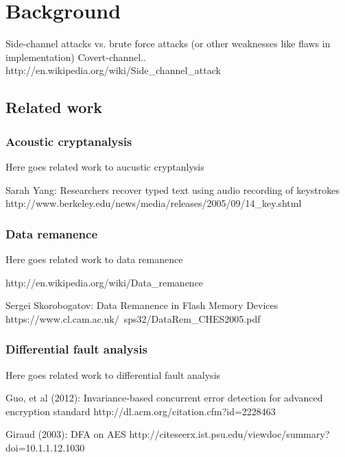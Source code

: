 \chapter{Background}
\label{chp:background} 

Side-channel attacks vs. brute force attacks (or other weaknesses like flaws in implementation)
Covert-channel.. 
http://en.wikipedia.org/wiki/Side\_channel\_attack


\section{Related work}\label{sec:related_work}

\subsection{Acoustic cryptanalysis}\label{sec:acoustic_cryptanalysis}

Here goes related work to aucustic cryptanlysis

Sarah Yang: Researchers recover typed text using audio recording of keystrokes 
http://www.berkeley.edu/news/media/releases/2005/09/14\_key.shtml


\subsection{Data remanence}\label{sec:data_remanence}

Here goes related work to data remanence

http://en.wikipedia.org/wiki/Data\_remanence

Sergei Skorobogatov: Data Remanence in Flash Memory Devices
https://www.cl.cam.ac.uk/~sps32/DataRem\_CHES2005.pdf

\subsection{Differential fault analysis}\label{sec:differential_fault_analysis}

Here goes related work to differential fault analysis

Guo, et al (2012): Invariance-based concurrent error detection for advanced encryption standard
http://dl.acm.org/citation.cfm?id=2228463

Giraud (2003): DFA on AES
http://citeseerx.ist.psu.edu/viewdoc/summary?doi=10.1.1.12.1030

